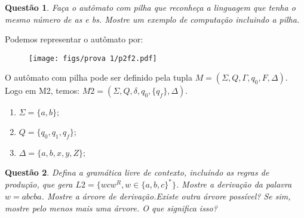 \documentclass{article}
\newtheorem{problem}{Questão}
\begin{document}
    \begin{problem}
        Faça o autômato com pilha que reconheça a linguagem que tenha o mesmo número de as e bs. Mostre um exemplo de computação incluindo a pilha.
    \end{problem}
    
    \begin{solution}
        Podemos representar o autômato por:
        \begin{figure}[H]
             \centering
             \texttt{[image: figs/prova 1/p2f2.pdf]}
        \end{figure}

        O autômato com pilha pode ser definido pela tupla $M = (\Sigma, Q, \Gamma, q_0, F, \Delta)$. Logo em M2, temos: $M2 = (\Sigma, Q, \delta, q_0, \{q_f\}, \Delta)$.
        
       \begin{enumerate}[label=]
            \item $\Sigma = \{a, b\};$
            \item $Q = \{q_0, q_1, q_f\};$
            \item $\Delta = \{a, b, x, y, Z\};$
        \end{enumerate}
        
    \end{solution}

    \begin{problem}
        Defina a gramática livre de contexto, incluíndo as regras de produção, que gera $L2 = \{ wcw^R, w \in \{a, b, c\}^* \}$. Mostre a derivação da palavra $w = abcba$. Mostre a árvore de derivação.Existe outra árvore possível? Se sim, mostre pelo menos mais uma árvore. O que significa isso?
    \end{problem}
    
\end{document}
